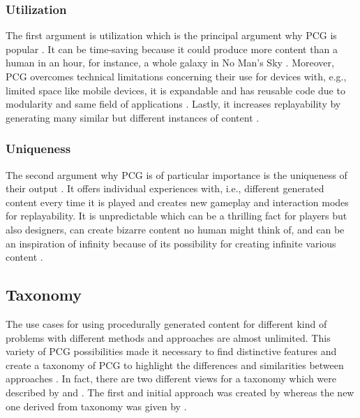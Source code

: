 \documentclass[MGS,Master,english]{twbook}%
\begin{document}
\subsubsection{Utilization}
The first argument is utilization which is the principal argument why \ac{PCG} is popular \cite{pcg::inGameDesign}. It can be time-saving because it could produce more content than a human in an hour, for instance, a whole galaxy in No Man’s Sky \cite{game::noMansSky} \cite{pcg::inGameDesign}. Moreover, \ac{PCG} overcomes technical limitations concerning their use for devices with, e.g., limited space like mobile devices, it is expandable and has reusable code due to modularity and same field of applications \cite{pcg::inGameDesign}. Lastly, it increases replayability by generating many similar but different instances of content \cite{pcg::inGameDesign}.

\subsubsection{Uniqueness}
The second argument why \ac{PCG} is of particular importance is the uniqueness of their output \cite{pcg::inGameDesign}. It offers individual experiences with, i.e., different generated content every time it is played and creates new gameplay and interaction modes for replayability. It is unpredictable which can be a thrilling fact for players but also designers, can create bizarre content no human might think of, and can be an inspiration of infinity because of its possibility for creating infinite various content \cite{pcg::inGameDesign}.


\subsection{Taxonomy}\label{PcgTaxonomy}
The use cases for using procedurally generated content for different kind of problems with different methods and approaches are almost unlimited. This variety of \ac{PCG} possibilities made it necessary to find distinctive features and create a taxonomy of \ac{PCG} to highlight the differences and similarities between approaches \cite{pcg::book}. In fact, there are two different views for a taxonomy which were described by \citep{pcg::survey} and \citep{pcg::book}. The first and initial approach was created by \citep{pcg::survey} whereas the new one derived from \citep{pcg::survey} taxonomy was given by \citep{pcg::book}.
\end{document}
